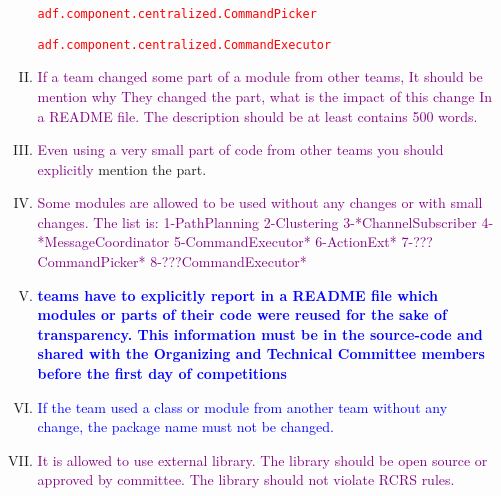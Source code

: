 \documentclass{article}
\begin{document}
\begin{enumerate}[(a)]
\begin{enumerate}[I.]
    \texttt{\textcolor{red}{adf.component.centralized.CommandPicker}}

    \texttt{\textcolor{red}{adf.component.centralized.CommandExecutor}}
    
    \item \textcolor{purple}{If a team changed some part of a module from other teams, It should be mention why They changed the part, what is the impact of this change In a README file. The description should be at least contains 500 words.}
    
    \item \textcolor{purple}{Even using a very small part of code from other teams you should explicitly} mention the part.
   \item \textcolor{purple}{Some modules are allowed to be used without any changes or with small changes. The list is:
1-PathPlanning
2-Clustering
3-*ChannelSubscriber
4-*MessageCoordinator 
5-CommandExecutor*
6-ActionExt*
7-???CommandPicker*
8-???CommandExecutor*
}
  \item \textbf{\textcolor{blue}{teams have to explicitly report in a README file which modules or parts of their code were reused for the sake of transparency. This information must be in the source-code and shared with the Organizing and Technical Committee members before the first day of competitions}}
  \item \textcolor{blue}{If the team used a class or module from another team without any change, the package name must not be changed.}
  \item \textcolor{purple}{It is allowed to use external library. The library should be open source or approved by committee. The library should not violate RCRS rules.}
  
\end{enumerate}


\end{enumerate}
\end{document}
